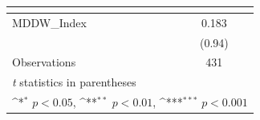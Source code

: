 {
\def\sym#1{\ifmmode^{#1}\else\(^{#1}\)\fi}
\begin{tabular}{l*{1}{c}}
\toprule
                    &\multicolumn{1}{c}{} \\
\midrule
MDDW\_Index          &       0.183         \\
                    &      (0.94)         \\
\midrule
Observations        &         431         \\
\bottomrule
\multicolumn{2}{l}{\footnotesize \textit{t} statistics in parentheses}\\
\multicolumn{2}{l}{\footnotesize \sym{*} \(p<0.05\), \sym{**} \(p<0.01\), \sym{***} \(p<0.001\)}\\
\end{tabular}
}
